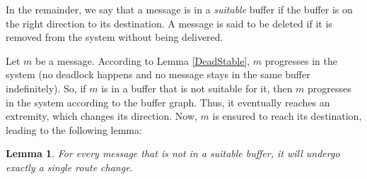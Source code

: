 \documentclass{llncs}
\newtheorem{lem}{Lemma}
\begin{document}
In the remainder, we say that a message is in a {\em suitable} buffer if the buffer is on the right direction to its
destination.  
A message is said to be deleted if it is removed from the system without being delivered.

Let $m$ be a message. According to Lemma \ref{DeadStable}, $m$ progresses in the system (no deadlock happens and no message stays in the same buffer indefinitely). 
So, if $m$ is in a buffer that is not suitable for it, then $m$ progresses in the system according to the buffer
graph. Thus, it eventually reaches an extremity, which changes its direction.  Now, $m$ is ensured to reach its
destination, leading to the following lemma:

\begin{lem}\label{changeR}
For every message that is not in a suitable buffer, it will undergo exactly a single route change.
\end{lem}   
\end{document}
